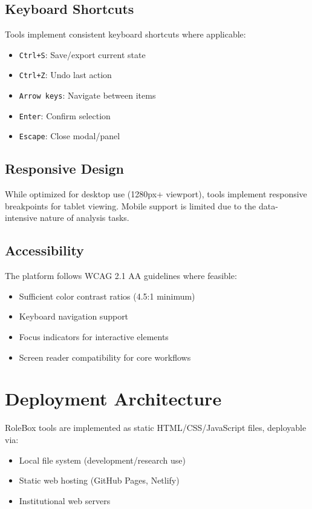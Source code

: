 \subsection{Keyboard Shortcuts}

Tools implement consistent keyboard shortcuts where applicable:
\begin{itemize}
    \item \texttt{Ctrl+S}: Save/export current state
    \item \texttt{Ctrl+Z}: Undo last action
    \item \texttt{Arrow keys}: Navigate between items
    \item \texttt{Enter}: Confirm selection
    \item \texttt{Escape}: Close modal/panel
\end{itemize}

\subsection{Responsive Design}

While optimized for desktop use (1280px+ viewport), tools implement responsive breakpoints for tablet viewing. Mobile support is limited due to the data-intensive nature of analysis tasks.

\subsection{Accessibility}

The platform follows WCAG 2.1 AA guidelines where feasible:
\begin{itemize}
    \item Sufficient color contrast ratios (4.5:1 minimum)
    \item Keyboard navigation support
    \item Focus indicators for interactive elements
    \item Screen reader compatibility for core workflows
\end{itemize}

\section{Deployment Architecture}

RoleBox tools are implemented as static HTML/CSS/JavaScript files, deployable via:
\begin{itemize}
    \item Local file system (development/research use)
    \item Static web hosting (GitHub Pages, Netlify)
    \item Institutional web servers
\end{itemize}

